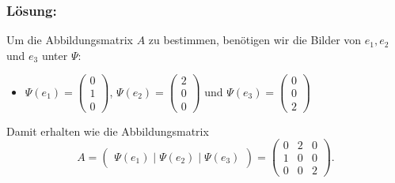 %
\begin{frame}\frametitle{Lösung:}
%
Um die Abbildungsmatrix $A$ zu bestimmen, benötigen wir die Bilder von $e_1,e_2$ und $e_3$ unter $\Psi$:

\begin{itemize}

\item $\Psi(e_1)=\begin{pmatrix} 0 \\ 1 \\ 0\end{pmatrix}$, $\Psi(e_2)= \begin{pmatrix}2\\0\\0\end{pmatrix}$ und $\Psi(e_3)= \begin{pmatrix}0\\0\\2\end{pmatrix}$
\end{itemize}
\vfill
Damit erhalten wie die Abbildungsmatrix 
$$
A=\begin{pmatrix} \Psi(e_1)\mid \Psi(e_2) \mid \Psi(e_3)\end{pmatrix}=\begin{pmatrix}0&2&0\\1&0&0\\0&0&2 \end{pmatrix}.
$$

\end{frame}
%
%


